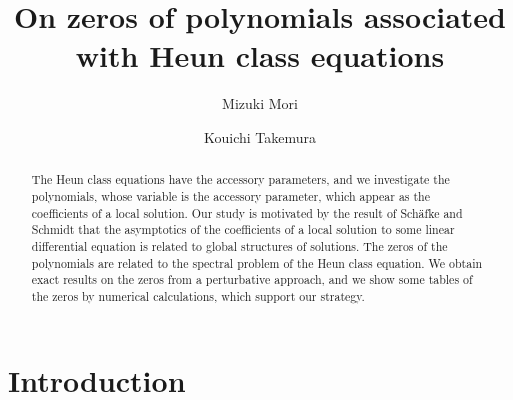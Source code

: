 \documentclass[12pt]{amsart}
\numberwithin{equation}{section}
\theoremstyle{definition}
\theoremstyle{remark}
\begin{document}
\title[On zeros of polynomials associated with Heun class equations]
{On zeros of polynomials associated with Heun class equations}
\author{Mizuki Mori}
\author{Kouichi Takemura}
\address{Department of Mathematics, Ochanomizu University, 2-1-1 Otsuka, Bunkyo-ku, Tokyo 112-8610, Japan}
\begin{abstract}
The Heun class equations have the accessory parameters, and we investigate the polynomials, whose variable is the accessory parameter, which appear as the coefficients of a local solution.
Our study is motivated by the result of Sch\"afke and Schmidt that the asymptotics of the coefficients of a local solution to some linear differential equation is related to global structures of solutions.
The zeros of the polynomials are related to the spectral problem of the Heun class equation.
We obtain exact results on the zeros from a perturbative approach, and we show some tables of the zeros by numerical calculations, which support our strategy.
\end{abstract}
\maketitle

\section{Introduction}
\end{document}
